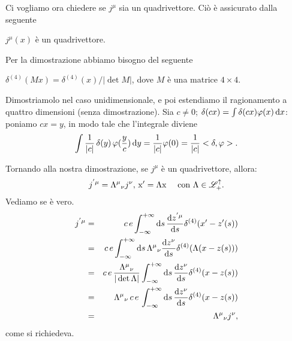 Ci vogliamo ora chiedere se $j^{\mu}$ sia un quadrivettore. Ci\`o \`e
assicurato dalla seguente
\begin{proposizione}
  $j^{\mu}(x)$ \`e un quadrivettore.
\end{proposizione}
\begin{dimostrazione}
  Per la dimostrazione abbiamo bisogno del seguente
  \begin{lemma}
    $\delta^{(4)}(Mx)=\delta^{(4)}(x)/|\det M|$, dove $M$ \`e una
    matrice $4 \times 4$.
  \end{lemma}
  \begin{dimostrazione}
    Dimostriamolo nel caso unidimensionale, e poi estendiamo il
    ragionamento a quattro dimensioni (senza dimostrazione). Sia $c
    \neq 0$; $\delta(cx) = \int \delta (cx) \varphi(x) \, \mathrm{d} x$:
    poniamo $cx=y$, in modo tale che l'integrale diviene
$$
\int \frac{1}{|c|}\,\delta(y)\,\varphi(\frac{y}{c})\,\mathrm{d} y =
\frac{1}{|c|}\varphi(0) = \frac{1}{|c|} <\delta,\varphi>.
$$
\end{dimostrazione}
Tornando alla nostra dimostrazione, se $j^{\mu}$ \`e un quadrivettore,
allora:
$$
j^{'\mu} = \Lambda^{\mu}{}_{\nu}j^{\nu},\,\mathrm{x}'=\Lambda \mathrm{x} \quad
\mbox{ con } \Lambda \in \mathscr{L}_{+}^{\uparrow}.
$$
Vediamo se \`e vero.
\begin{eqnarray*}
  j^{'\mu} & = &  c\,e\int_{-\infty}^{+\infty} \mathrm{d} s \,\frac{\mathrm{d}
    z^{'\mu}}{\mathrm{d} s} \delta^{(4)}(x'-z'(s))\\
  & = & c\,e \int_{-\infty}^{+\infty} \mathrm{d} s \, \Lambda^{\mu}{}_{\nu}
  \frac{\mathrm{d}
    z^{\nu}}{\mathrm{d} s} \delta^{(4)}(\Lambda(x-z(s)))\\
  & = & c \, e \, \frac{\Lambda^{\mu}{}_{\nu}}{|\det
    \Lambda|}\int_{-\infty}^{+\infty} \mathrm{d} s \, \frac{\mathrm{d} z^{\nu}}{\mathrm{d} s}
  \delta^{(4)}(x-z(s))\\
  & = & \Lambda^{\mu}{}_{\nu} \, c \, e \, \int_{-\infty}^{+\infty} \mathrm{d}
  s
  \, \frac{\mathrm{d} z^{\nu}}{\mathrm{d} s} \delta^{(4)}(x-z(s))\\
  & = & \Lambda^{\mu}{}_{\nu} j^{\nu},
\end{eqnarray*}
come si richiedeva.
\end{dimostrazione}



